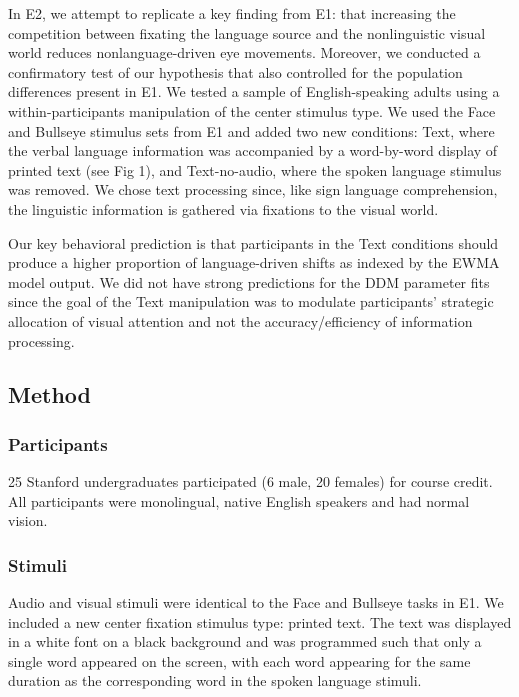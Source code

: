 \documentclass[10pt, letterpaper]{article}
\begin{document}
In E2, we attempt to replicate a key finding from E1: that increasing
the competition between fixating the language source and the
nonlinguistic visual world reduces nonlanguage-driven eye movements.
Moreover, we conducted a confirmatory test of our hypothesis that also
controlled for the population differences present in E1. We tested a
sample of English-speaking adults using a within-participants
manipulation of the center stimulus type. We used the Face and Bullseye
stimulus sets from E1 and added two new conditions: Text, where the
verbal language information was accompanied by a word-by-word display of
printed text (see Fig 1), and Text-no-audio, where the spoken language
stimulus was removed. We chose text processing since, like sign language
comprehension, the linguistic information is gathered via fixations to
the visual world.

Our key behavioral prediction is that participants in the Text
conditions should produce a higher proportion of language-driven shifts
as indexed by the EWMA model output. We did not have strong predictions
for the DDM parameter fits since the goal of the Text manipulation was
to modulate participants' strategic allocation of visual attention and
not the accuracy/efficiency of information processing.

\subsection{Method}\label{method-1}

\subsubsection{Participants}\label{participants-1}

25 Stanford undergraduates participated (6 male, 20 females) for course
credit. All participants were monolingual, native English speakers and
had normal vision.

\subsubsection{Stimuli}\label{stimuli-1}

Audio and visual stimuli were identical to the Face and Bullseye tasks
in E1. We included a new center fixation stimulus type: printed text.
The text was displayed in a white font on a black background and was
programmed such that only a single word appeared on the screen, with
each word appearing for the same duration as the corresponding word in
the spoken language stimuli.
\end{document}
